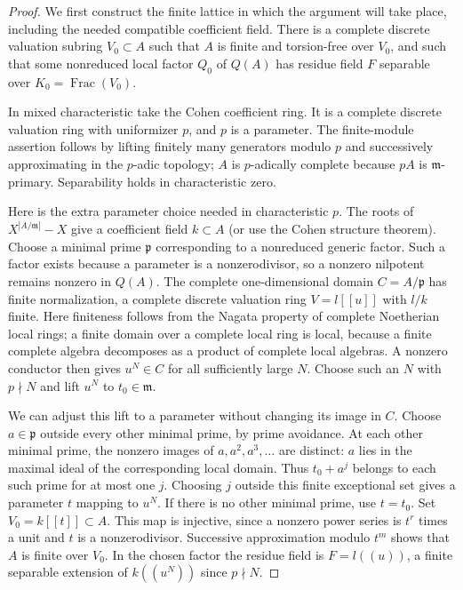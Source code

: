 \documentclass[11pt,a4paper]{article}
\theoremstyle{definition}
\begin{document}
\begin{proof}
We first construct the finite lattice in which the argument
will take place, including the needed compatible coefficient
field. There is a complete discrete valuation subring
$V_0\subset A$ such that $A$ is finite and torsion-free over
$V_0$, and such that some nonreduced local factor $Q_0$ of
$Q(A)$ has residue field $F$ separable over
$K_0=\operatorname{Frac}(V_0)$.

In mixed characteristic take the Cohen coefficient ring.
It is a complete discrete valuation ring with uniformizer
$p$, and $p$ is a parameter. The finite-module assertion
follows by lifting finitely many generators modulo $p$ and
successively approximating in the $p$-adic topology;
$A$ is $p$-adically complete because $pA$ is
$\mathfrak m$-primary. Separability holds in characteristic
zero.

Here is the extra parameter choice needed in characteristic
$p$. The roots of $X^{|A/\mathfrak m|}-X$ give a coefficient
field $k\subset A$ (or use the Cohen structure theorem).
Choose a minimal prime $\mathfrak p$ corresponding to a
nonreduced generic factor. Such a factor exists because a
parameter is a nonzerodivisor, so a nonzero nilpotent remains
nonzero in $Q(A)$. The complete one-dimensional domain
$C=A/\mathfrak p$ has finite normalization, a complete
discrete valuation ring $V=l[[u]]$ with $l/k$ finite.
Here finiteness follows from the Nagata property of complete
Noetherian local rings; a finite domain over a complete local
ring is local, because a finite complete algebra decomposes
as a product of complete local algebras. A nonzero conductor
then gives $u^N\in C$ for all sufficiently large $N$.
Choose such an $N$ with $p\nmid N$ and lift $u^N$ to
$t_0\in\mathfrak m$.

We can adjust this lift to a parameter without changing its
image in $C$. Choose
$a\in\mathfrak p$ outside every other minimal prime, by
prime avoidance. At each other minimal prime, the nonzero
images of $a,a^2,a^3,\ldots$ are distinct: $a$ lies in
the maximal ideal of the corresponding local domain.
Thus $t_0+a^j$ belongs to each such prime for at most one
$j$. Choosing $j$ outside this finite exceptional set gives
a parameter $t$ mapping to $u^N$. If there is no other
minimal prime, use $t=t_0$.
Set $V_0=k[[t]]\subset A$. This map is injective, since
a nonzero power series is $t^r$ times a unit and $t$ is a
nonzerodivisor. Successive approximation modulo $t^m$ shows
that $A$ is finite over $V_0$. In the chosen factor the
residue field is $F=l((u))$, a finite separable extension
of $k((u^N))$ since $p\nmid N$.


\end{proof}
\end{document}
